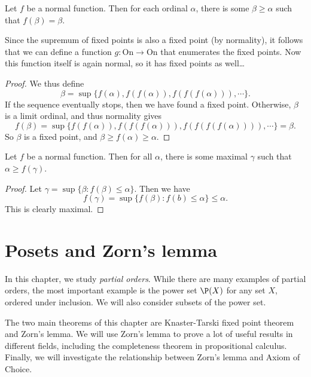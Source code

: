 \documentclass[a4paper]{article}
\begin{document}
\begin{own}
  \begin{lemma}
    Let $f$ be a normal function. Then for each ordinal $\alpha$, there is some $\beta \geq \alpha$ such that $f(\beta) = \beta$.
  \end{lemma}
  Since the supremum of fixed points is also a fixed point (by normality), it follows that we can define a function $g: \mathrm{On} \to \mathrm{On}$ that enumerates the fixed points. Now this function itself is again normal, so it has fixed points as well\ldots

  \begin{proof}
    We thus define
    \[
      \beta = \sup \{f(\alpha), f(f(\alpha)), f(f(f(\alpha))), \cdots\}.
    \]
    If the sequence eventually stops, then we have found a fixed point. Otherwise, $\beta$ is a limit ordinal, and thus normality gives
    \[
      f(\beta) = \sup\{f(f(\alpha)), f(f(f(\alpha))), f(f(f(f(\alpha)))), \cdots\} = \beta.
    \]
    So $\beta$ is a fixed point, and $\beta \geq f(\alpha) \geq \alpha$.
  \end{proof}

  \begin{lemma}
    Let $f$ be a normal function. Then for all $\alpha$, there is some maximal $\gamma$ such that $\alpha \geq f(\gamma)$.
  \end{lemma}

  \begin{proof}
    Let $\gamma = \sup\{\beta: f(\beta) \leq \alpha\}$. Then we have
    \[
      f(\gamma) = \sup\{f(\beta): f(b) \leq \alpha\} \leq \alpha.
    \]
    This is clearly maximal.
  \end{proof}
\end{own}
\section{Posets and Zorn's lemma}
\label{sec:poset}
In this chapter, we study \emph{partial orders}. While there are many examples of partial orders, the most important example is the power set $\P(X)$ for any set $X$, ordered under inclusion. We will also consider subsets of the power set.

The two main theorems of this chapter are Knaster-Tarski fixed point theorem and Zorn's lemma. We will use Zorn's lemma to prove a lot of useful results in different fields, including the completeness theorem in propositional calculus. Finally, we will investigate the relationship between Zorn's lemma and Axiom of Choice.
\end{document}

